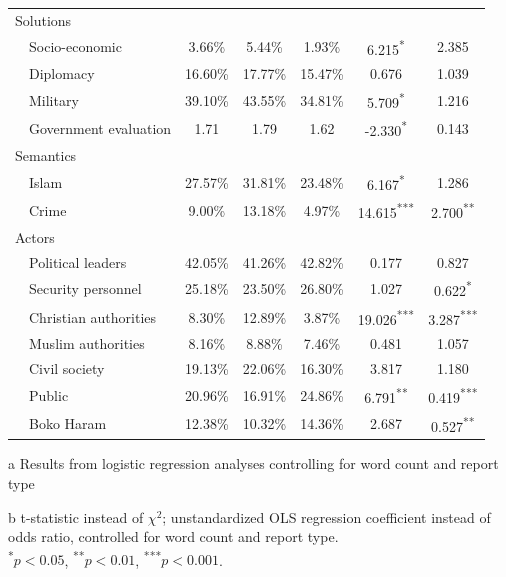 \begin{table}[H]
\begin{threeparttable}
{\begin{tabular}{@{}llccccc@{}}
\multicolumn{2}{l}{Solutions}    &         &         &         &           &          \\
     & Socio-economic            & 3.66\%  & 5.44\%  & 1.93\%  & 6.215\textsuperscript{*}    & 2.385    \\
     & Diplomacy                 & 16.60\% & 17.77\% & 15.47\% & 0.676     & 1.039    \\
     & Military                  & 39.10\% & 43.55\% & 34.81\% & 5.709\textsuperscript{*}    & 1.216    \\
     & Government evaluation     & 1.71    & 1.79    & 1.62    & -2.330\textsuperscript{*}   & 0.143\tnote{b}   \\
\multicolumn{2}{l}{Semantics}    &         &         &         &           &          \\
     & Islam                     & 27.57\% & 31.81\% & 23.48\% & 6.167\textsuperscript{*}    & 1.286    \\
     & Crime                     & 9.00\%  & 13.18\% & 4.97\%  & 14.615\textsuperscript{***} & 2.700\textsuperscript{**}  \\
\multicolumn{2}{l}{Actors}       &         &         &         &           &          \\
     & Political leaders         & 42.05\% & 41.26\% & 42.82\% & 0.177     & 0.827    \\
     & Security personnel        & 25.18\% & 23.50\% & 26.80\% & 1.027     & 0.622\textsuperscript{*}   \\
     & Christian authorities     & 8.30\%  & 12.89\% & 3.87\%  & 19.026\textsuperscript{***} & 3.287\textsuperscript{***} \\
     & Muslim authorities        & 8.16\%  & 8.88\%  & 7.46\%  & 0.481     & 1.057    \\
     & Civil society             & 19.13\% & 22.06\% & 16.30\% & 3.817     & 1.180    \\
     & Public                    & 20.96\% & 16.91\% & 24.86\% & 6.791\textsuperscript{**}   & 0.419\textsuperscript{***} \\
     & Boko Haram                & 12.38\% & 10.32\% & 14.36\% & 2.687     & 0.527\textsuperscript{**}  \\ \bottomrule
\end{tabular}}
\begin{tablenotes}
\vspace{-5mm}
\singlespacing
\footnotesize
\item[a] Results from logistic regression analyses controlling for word count and report type
\item[b] t-statistic instead of $\chi^2$; unstandardized OLS regression coefficient instead of odds ratio, controlled for word count and report type. \\ \textsuperscript{*}\(p<0.05\), \textsuperscript{**}\(p<0.01\), \textsuperscript{***}\(p<0.001\).
\end{tablenotes}
\end{threeparttable}
\end{table}
\newpage

